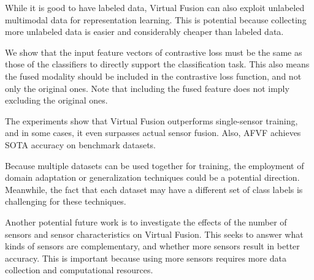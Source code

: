 \documentclass[conference]{IEEEtran}
\begin{document}
While it is good to have labeled data, Virtual Fusion can also exploit unlabeled multimodal data for representation learning. This is potential because collecting more unlabeled data is easier and considerably cheaper than labeled data.

We show that the input feature vectors of contrastive loss must be the same as those of the classifiers to directly support the classification task. This also means the fused modality should be included in the contrastive loss function, and not only the original ones. Note that including the fused feature does not imply excluding the original ones.

The experiments show that Virtual Fusion outperforms single-sensor training, and in some cases, it even surpasses actual sensor fusion. Also, AFVF achieves SOTA accuracy on benchmark datasets.

Because multiple datasets can be used together for training, the employment of domain adaptation or generalization techniques could be a potential direction. Meanwhile, the fact that each dataset may have a different set of class labels is challenging for these techniques.

Another potential future work is to investigate the effects of the number of sensors and sensor characteristics on Virtual Fusion. This seeks to answer what kinds of sensors are complementary, and whether more sensors result in better accuracy. This is important because using more sensors requires more data collection and computational resources.





\end{document}
